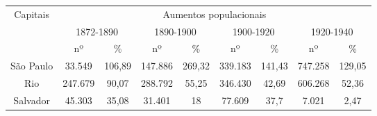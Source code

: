 \begin{table}[!htp]
\centering
{}
{\begin{tabular}{|c|c|c|c|c|c|c|c|c|}
\cline{1-9}
\multirow{3}{*}{Capitais} &\multicolumn{8}{c|}{Aumentos populacionais}\\
\cline{2-9} & \multicolumn{2}{|c|}{1872-1890} & \multicolumn{2}{|c|}{1890-1900} & \multicolumn{2}{|c|}{1900-1920} & \multicolumn{2}{|c|}{1920-1940}	\\
\cline{2-9} &nº &\% &nº &\% &nº &\% &nº &\%\\
\cline{1-9} São Paulo &33.549 &106,89 &147.886 &269,32 &339.183 &141,43 &747.258 &129,05\\
\cline{1-9} Rio &247.679 &90,07 &288.792 &55,25 &346.430 &42,69 &606.268 &52,36\\
\cline{1-9} Salvador &45.303 &35,08 &31.401 &18 &77.609 &37,7 &7.021 &2,47\\
\hline
\end{tabular} }
{  }
\end{table}